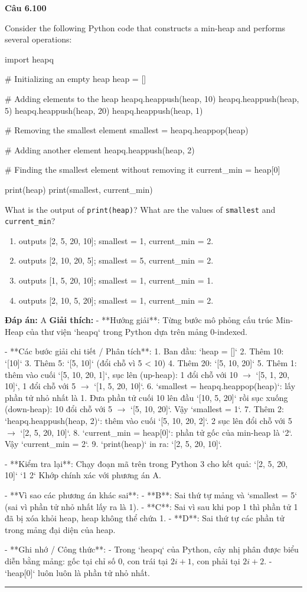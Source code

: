 \documentclass[11pt,a4paper]{article}
\newenvironment{question}[1]{%
  \par\vspace{1em}\noindent\textbf{\large Câu #1}\par\vspace{0.4em}
}{%
  \par\vspace{1em}\hrule\vspace{0.6em}
}
\newenvironment{choices}{%
  \begin{enumerate}[label=\textbf{\Alph*.},leftmargin=2.2em,itemsep=2pt,topsep=3pt]
}{%
  \end{enumerate}
}
\newcommand{\choice}{\item}
\newenvironment{codebox}{%
  \begin{tcolorbox}[colback=gray!8!white,colframe=gray!50!black,arc=1.5mm,boxrule=0.6pt,left=3mm,right=3mm,top=2.5mm,bottom=2.5mm]
  \ttfamily\small
}{%
  \end{tcolorbox}
}
\begin{document}
\begin{question}{6.100}
Consider the following Python code that constructs a min-heap and performs several operations:
\begin{codebox}
import heapq

# Initializing an empty heap
heap = []

# Adding elements to the heap
heapq.heappush(heap, 10)
heapq.heappush(heap, 5)
heapq.heappush(heap, 20)
heapq.heappush(heap, 1)

# Removing the smallest element
smallest = heapq.heappop(heap)

# Adding another element
heapq.heappush(heap, 2)

# Finding the smallest element without removing it
current_min = heap[0]

print(heap)
print(smallest, current_min)
\end{codebox}
What is the output of \texttt{print(heap)}? What are the values of \texttt{smallest} and \texttt{current\_min}?
\begin{choices}
\choice outputs [2, 5, 20, 10]; smallest = 1, current_min = 2.
\choice outputs [2, 10, 20, 5]; smallest = 5, current_min = 2.
\choice outputs [1, 5, 20, 10]; smallest = 1, current_min = 1.
\choice outputs [2, 10, 5, 20]; smallest = 1, current_min = 2.
\end{choices}
\textbf{Đáp án:} A
\textbf{Giải thích:} - **Hướng giải**:
  Từng bước mô phỏng cấu trúc Min-Heap của thư viện `heapq` trong Python dựa trên mảng 0-indexed.

- **Các bước giải chi tiết / Phân tích**:
  1. Ban đầu: `heap = []`
  2. Thêm 10: `[10]`
  3. Thêm 5: `[5, 10]` (đổi chỗ vì 5 < 10)
  4. Thêm 20: `[5, 10, 20]`
  5. Thêm 1: thêm vào cuối `[5, 10, 20, 1]`, sục lên (up-heap): 1 đổi chỗ với 10 \(\rightarrow\) `[5, 1, 20, 10]`, 1 đổi chỗ với 5 \(\rightarrow\) `[1, 5, 20, 10]`.
  6. `smallest = heapq.heappop(heap)`: lấy phần tử nhỏ nhất là 1. Đưa phần tử cuối 10 lên đầu `[10, 5, 20]` rồi sục xuống (down-heap): 10 đổi chỗ với 5 \(\rightarrow\) `[5, 10, 20]`. Vậy `smallest = 1`.
  7. Thêm 2: `heapq.heappush(heap, 2)`: thêm vào cuối `[5, 10, 20, 2]`. 2 sục lên đổi chỗ với 5 \(\rightarrow\) `[2, 5, 20, 10]`.
  8. `current_min = heap[0]`: phần tử gốc của min-heap là `2`. Vậy `current_min = 2`.
  9. `print(heap)` in ra: `[2, 5, 20, 10]`.

- **Kiểm tra lại**:
  Chạy đoạn mã trên trong Python 3 cho kết quả:
  `[2, 5, 20, 10]`
  `1 2`
  Khớp chính xác với phương án A.

- **Vì sao các phương án khác sai**:
  - **B**: Sai thứ tự mảng và `smallest = 5` (sai vì phần tử nhỏ nhất lấy ra là 1).
  - **C**: Sai vì sau khi pop 1 thì phần tử 1 đã bị xóa khỏi heap, heap không thể chứa 1.
  - **D**: Sai thứ tự các phần tử trong mảng đại diện của heap.

- **Ghi nhớ / Công thức**:
  - Trong `heapq` của Python, cây nhị phân được biểu diễn bằng mảng: gốc tại chỉ số 0, con trái tại \(2i + 1\), con phải tại \(2i + 2\).
  - `heap[0]` luôn luôn là phần tử nhỏ nhất.
\end{question}
\end{document}
